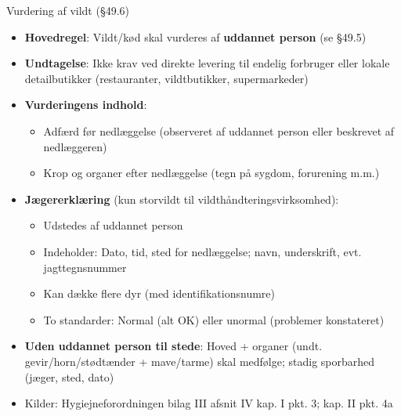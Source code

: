 \begin{frame}{Vurdering af vildt (§49.6)}
    \begin{itemize}
        \item \textbf{Hovedregel}: Vildt/kød skal vurderes af \textbf{uddannet person} (se §49.5)
        \item \textbf{Undtagelse}: Ikke krav ved direkte levering til endelig forbruger eller lokale detailbutikker (restauranter, vildtbutikker, supermarkeder)
        \item \textbf{Vurderingens indhold}:
          \begin{itemize}
            \item Adfærd før nedlæggelse (observeret af uddannet person eller beskrevet af nedlæggeren)
            \item Krop og organer efter nedlæggelse (tegn på sygdom, forurening m.m.)
          \end{itemize}
        \item \textbf{Jægererklæring} (kun storvildt til vildthåndteringsvirksomhed):
          \begin{itemize}
            \item Udstedes af uddannet person
            \item Indeholder: Dato, tid, sted for nedlæggelse; navn, underskrift, evt. jagttegnsnummer
            \item Kan dække flere dyr (med identifikationsnumre)
            \item To standarder: Normal (alt OK) eller unormal (problemer konstateret)
          \end{itemize}
        \item \textbf{Uden uddannet person til stede}: Hoved + organer (undt. gevir/horn/stødtænder + mave/tarme) skal medfølge; stadig sporbarhed (jæger, sted, dato)
        \item Kilder: Hygiejneforordningen bilag III afsnit IV kap. I pkt. 3; kap. II pkt. 4a
    \end{itemize}
\end{frame}